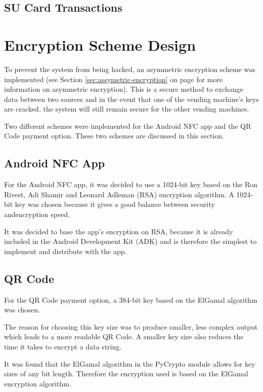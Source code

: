 \subsection{SU Card Transactions}
\label{sec:su-card}


\section{Encryption Scheme Design}

To prevent the system from being hacked, an asymmetric encryption scheme was
implemented (see Section \ref{sec:assymetric-encryption} on page
\pageref{sec:assymetric-encryption} for more information on asymmetric encryption).
This is a secure method to exchange data between two sources and in the event that
one of the vending machine's keys are cracked, the system will still remain
secure for the other vending machines.

Two different schemes were implemented for the Android NFC app and the QR Code
payment option. These two schemes are discussed in this section.

\subsection{Android NFC App}

For the Android NFC app, it was decided to use a 1024-bit key based on the Ron
Rivest, Adi Shamir and Leonard Adleman (RSA) encryption algorithm. A 1024-bit key was chosen because it gives a good balance between security andencryption speed. 

It was decided to base the app's encryption on RSA, because it is already included in the Android
Development Kit (ADK) and is therefore the simplest to implement and distribute
with the app. 

\subsection{QR Code}

For the QR Code payment option, a 384-bit key based on the ElGamal algorithm was
chosen. 

The reason for choosing this key size was to produce smaller, less complex output which leads to a more readable QR Code. A smaller key size also reduces the time it takes to encrypt a data string.

It was found that the ElGamal algorithm in the PyCrypto module allows for key sizes of any bit
length. Therefore the encryption used is based on the ElGamal encryption algorithm.
